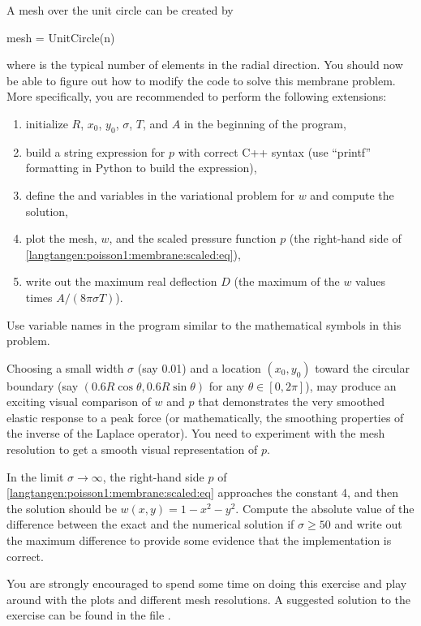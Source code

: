 A mesh over the unit circle can be created
by
\begin{python}
mesh = UnitCircle(n)
\end{python}
where  is the typical number of elements in the radial direction.
You should now be able to figure out how to modify the
 code to solve this membrane problem.
More specifically, you are recommended to perform the following extensions:
\begin{enumerate}
\item  initialize $R$, $x_0$, $y_0$, $\sigma$, $T$, and $A$ in the
beginning of the program,
\item
build a string expression for $p$ with correct C++ syntax
(use ``printf'' formatting in Python to build the expression),
\item
define the  and  variables in the variational problem for
$w$ and compute the solution,
\item plot the mesh,
$w$, and the scaled pressure function $p$ (the right-hand side of
\eqref{langtangen:poisson1:membrane:scaled:eq}),
\item write out the maximum real deflection $D$ (the maximum of
  the $w$ values times $A/(8\pi\sigma T)$).
\end{enumerate}
Use variable names in the program similar to the mathematical symbols
in this problem.

Choosing a small width $\sigma$ (say 0.01) and a location $(x_0,y_0)$
toward the circular boundary (say $(0.6R\cos\theta, 0.6R\sin\theta)$
for any $\theta\in [0,2\pi]$), may produce an exciting visual
comparison of $w$ and $p$ that demonstrates the very smoothed elastic
response to a peak force (or mathematically, the smoothing properties
of the inverse of the Laplace operator).  You need to experiment with
the mesh resolution to get a smooth visual representation of $p$.

In the limit $\sigma\rightarrow\infty$, the right-hand side $p$ of
\eqref{langtangen:poisson1:membrane:scaled:eq} approaches the constant
4, and then the solution should be $w(x,y) = 1-x^2-y^2$.  Compute the
absolute value of the difference between the exact and the numerical
solution if $\sigma \geqslant 50$ and write out the maximum difference to
provide some evidence that the implementation is correct.

You are strongly encouraged to spend some time on doing this exercise
and play around with the plots and different mesh resolutions.  A
suggested solution to the exercise can be found in the file
.

